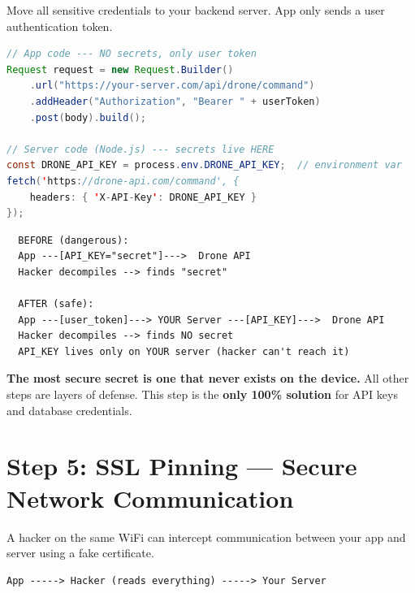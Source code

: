 \documentclass[11pt,a4paper]{article}
\begin{document}
\begin{solutionbox}
Move all sensitive credentials to your backend server. App only sends a user authentication token.

\begin{lstlisting}[language=Java]
// App code --- NO secrets, only user token
Request request = new Request.Builder()
    .url("https://your-server.com/api/drone/command")
    .addHeader("Authorization", "Bearer " + userToken)
    .post(body).build();

// Server code (Node.js) --- secrets live HERE
const DRONE_API_KEY = process.env.DRONE_API_KEY;  // environment var
fetch('https://drone-api.com/command', {
    headers: { 'X-API-Key': DRONE_API_KEY }
});
\end{lstlisting}
\end{solutionbox}

\begin{diagrambox}
\begin{verbatim}
  BEFORE (dangerous):
  App ---[API_KEY="secret"]--->  Drone API
  Hacker decompiles --> finds "secret"

  AFTER (safe):
  App ---[user_token]---> YOUR Server ---[API_KEY]--->  Drone API
  Hacker decompiles --> finds NO secret
  API_KEY lives only on YOUR server (hacker can't reach it)
\end{verbatim}
\end{diagrambox}

\begin{notebox}
\textbf{The most secure secret is one that never exists on the device.} All other steps are layers of defense. This step is the \textbf{only 100\% solution} for API keys and database credentials.
\end{notebox}

\newpage
\section{Step 5: SSL Pinning --- Secure Network Communication}

\begin{problembox}
A hacker on the same WiFi can intercept communication between your app and server using a fake certificate.
\begin{verbatim}
App -----> Hacker (reads everything) -----> Your Server
\end{verbatim}
\end{problembox}
\end{document}
